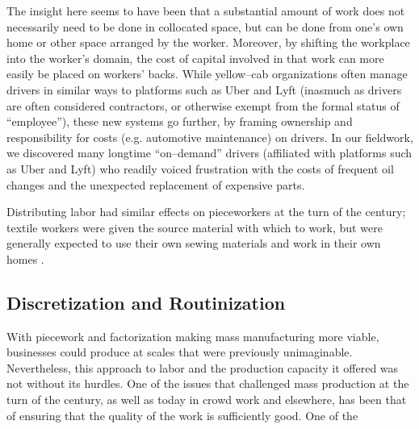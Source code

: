 \documentclass{sigchi}
\begin{document}
The insight here seems to have been that
a substantial amount of work does not necessarily need to be done in collocated space,
but can be done from one's own home or other space arranged by the worker.
Moreover, by shifting the workplace into the worker's domain,
the cost of capital involved in that work can more easily be placed on workers' backs.
While yellow--cab organizations often manage drivers in similar ways to platforms such as Uber and Lyft
(inasmuch as drivers are often considered contractors, or otherwise exempt from the formal status of ``employee''),
these new systems go further,
by framing ownership and responsibility for costs
(e.g. automotive maintenance)
on drivers.
In our fieldwork, we discovered many longtime ``on--demand'' drivers
(affiliated with platforms such as Uber and Lyft)
who readily voiced frustration with the costs of
frequent oil changes and the unexpected replacement of expensive parts.

Distributing labor had similar effects on pieceworkers at the turn of the  century;
textile workers were given the source material with which to work,
but were generally expected to use their own sewing materials and work in their own homes
\cite{hapke2004sweatshop}.








\subsection{Discretization and Routinization}

With piecework and factorization making mass manufacturing more viable,
businesses could produce at scales that were previously unimaginable.
Nevertheless, this approach to labor and the production capacity it offered was not without its hurdles.
One of the issues that challenged mass production at the turn of the  century,
as well as today in crowd work and elsewhere,
has been that of ensuring that the quality of the work is sufficiently good.
One of the 
\end{document}
